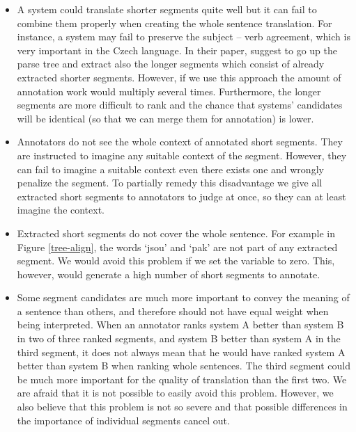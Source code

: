 \begin{itemize}

  \item A system could translate shorter segments quite well but it can fail to
    combine them properly when creating the whole sentence translation. For
    instance, a system may fail to preserve the subject -- verb agreement,
    which is very important in the Czech language.  In their paper,
     suggest to go up the parse tree and extract
    also the longer segments which consist of already extracted shorter
    segments. However, if we use this approach the amount of annotation work
    would multiply several times. Furthermore, the longer segments are more
    difficult to rank and the chance that systems' candidates will be identical
    (so that we can merge them for annotation) is lower.

  \item Annotators do not see the whole context of annotated short segments.
    They are instructed to imagine any suitable context of the segment.
    However, they can fail to imagine a suitable context even there exists one
    and wrongly penalize the segment. To partially remedy this disadvantage we
    give all extracted short segments to annotators to judge at once, so they
    can at least imagine the context.

  \item Extracted short segments do not cover the whole sentence. For example
    in Figure \ref{tree-align}, the words `jsou' and `pak' are not part of any
    extracted segment. We would avoid this problem if we set the variable
     to zero. This, however, would generate a high number of short
    segments to annotate.

  \item Some segment candidates are much more important to convey the meaning
    of a sentence than others, and therefore should not have equal weight when
    being interpreted. When an annotator ranks system A better than system B in
    two of three ranked segments, and system B better than system A in the
    third segment, it does not always mean that he would have ranked system A
    better than system B when ranking whole sentences. The third segment could
    be much more important for the quality of translation than the first two.
    We are afraid that it is not possible to easily avoid this problem.
    However, we also believe that this problem is not so severe and that
    possible differences in the importance of individual segments cancel out.

\end{itemize}

